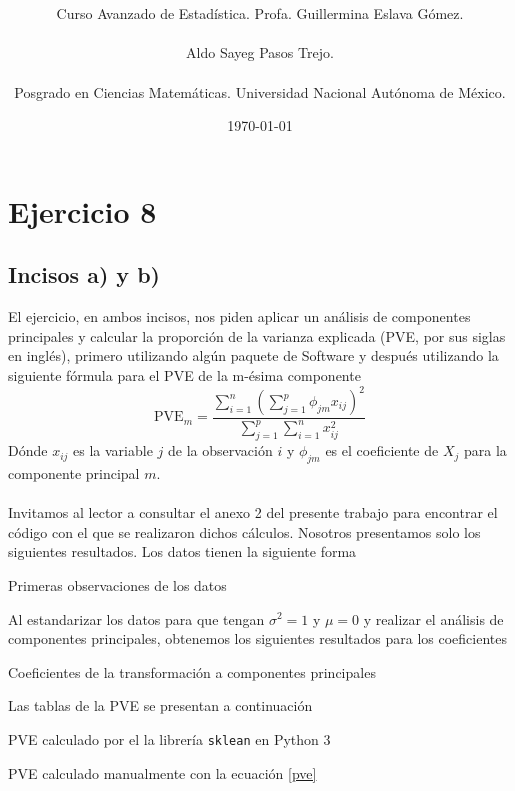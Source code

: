 \documentclass[11pt]{article}
\title{\textbf{\work}}
\author{Curso Avanzado de Estadística. Profa. Guillermina Eslava Gómez.\\ \\ Aldo Sayeg Pasos Trejo. \\ \\ Posgrado en Ciencias Matemáticas. Universidad Nacional Autónoma de México. }
\date{\today}
\begin{document}
\maketitle
\section{Ejercicio 8}
\subsection{Incisos a) y b)}
El ejercicio, en ambos incisos, nos piden aplicar un análisis de componentes principales y calcular la proporción de la varianza explicada (PVE, por sus siglas en inglés), primero utilizando algún paquete de Software y después utilizando la siguiente fórmula
para el PVE de la m-ésima componente
\begin{equation}
    \label{pve}
    \text{PVE}_m = \frac{\sum_{i=1}^n \left( \sum_{j=1}^p \phi_{jm} x_{ij} \right)^2} {\sum_{j=1}^p \sum_{i=1}^n x_{ij}^2 }
\end{equation}
Dónde $x_{ij}$ es la variable $j$ de la observación $i$ y $\phi_{jm}$ es el coeficiente de $X_j$ para la componente principal $m$.
\\
\\Invitamos al lector a consultar el anexo 2 del presente trabajo para encontrar el código con el que se realizaron dichos cálculos. Nosotros presentamos solo los siguientes resultados. Los datos tienen la siguiente forma
\begin{table}[H]
    \centering
    
    \caption{Primeras observaciones de los datos}
    \label{1-head}
\end{table}
Al estandarizar los datos para que tengan $\sigma^2 = 1$ y $\mu = 0$ y realizar el análisis de componentes principales, obtenemos los siguientes resultados para los coeficientes
\begin{table}[H]
    \centering
    
    \caption{Coeficientes de la transformación a componentes principales}
    \label{1-coeffTable}
\end{table}
Las tablas de la PVE se presentan a continuación
\begin{table}[H]
    \centering
    
    \caption{PVE calculado por el la librería \texttt{sklean} en Python 3}
    \label{1-pve}
\end{table}
\begin{table}[H]
    \centering
    
    \caption{PVE calculado manualmente con la ecuación \ref{pve}}
    \label{1-pveForm}
\end{table}
\end{document}
